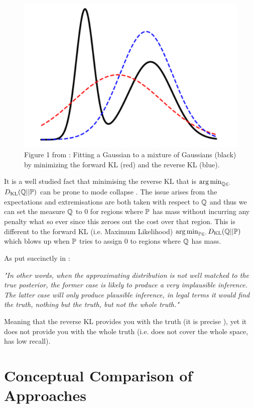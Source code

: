 \documentclass[a4paper,12pt,twoside,openright]{report}
\theoremstyle{definition}
\begin{document}
\begin{figure}
    \centering
    \includegraphics[scale=0.5]{images/zhang_et_al.PNG}
    \caption{Figure 1 from \cite{zhang2019variational}:  Fitting a Gaussian to a mixture of Gaussians (black) by
minimizing the forward KL (red) and the reverse KL (blue).}
    \label{fig:babrber_kl}
\end{figure}

It is a well studied fact that minimising the reverse KL that is $\argmin_{\Q \in \cdot }$ $\KL(\Q ||\P)$ can be prone to mode collapse \citep{zhang2019variational}. The issue arises from the expectations and extremisations are both taken with respect to $\Q$ and thus we can set the measure $\Q$ to 0 for regions where $\P$ has mass without incurring any penalty what so ever since this zeroes out the cost over that region. This is different to the forward KL (i.e. Maximum Likelihood)  $\argmin_{\P \in \cdot }\KL(\Q ||\P)$  which blows up  when $\P$ tries to assign $0$ to regions where $\Q$ has mass.

As put succinctly in \cite{lawrence2001variational}:

\textit{"In other words, when the approximating distribution is not
well matched to the true posterior, the former case is likely to produce a very implausible inference.
The latter case will only produce plausible inference, in legal terms it would find the truth, nothing
but the truth, but not the whole truth."}

Meaning that the reverse KL provides you with the truth (it is precise ), yet  it does not provide you with the whole truth (i.e. does not cover the whole space, has low recall).

\section{Conceptual Comparison of Approaches}
\end{document}
